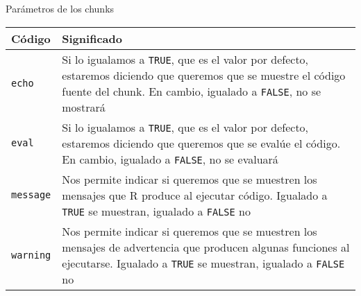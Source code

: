 \documentclass[ignorenonframetext,]{beamer}
\begin{document}
\begin{frame}[fragile]{Parámetros de los chunks}
\protect\hypertarget{parametros-de-los-chunks-1}{}

\begin{longtable}[]{@{}ll@{}}
\toprule
\begin{minipage}[b]{0.47\columnwidth}\raggedright
Código\strut
\end{minipage} & \begin{minipage}[b]{0.47\columnwidth}\raggedright
Significado\strut
\end{minipage}\tabularnewline
\midrule
\endhead
\begin{minipage}[t]{0.47\columnwidth}\raggedright
\texttt{echo}\strut
\end{minipage} & \begin{minipage}[t]{0.47\columnwidth}\raggedright
Si lo igualamos a \texttt{TRUE}, que es el valor por defecto, estaremos
diciendo que queremos que se muestre el código fuente del chunk. En
cambio, igualado a \texttt{FALSE}, no se mostrará\strut
\end{minipage}\tabularnewline
\begin{minipage}[t]{0.47\columnwidth}\raggedright
\texttt{eval}\strut
\end{minipage} & \begin{minipage}[t]{0.47\columnwidth}\raggedright
Si lo igualamos a \texttt{TRUE}, que es el valor por defecto, estaremos
diciendo que queremos que se evalúe el código. En cambio, igualado a
\texttt{FALSE}, no se evaluará\strut
\end{minipage}\tabularnewline
\begin{minipage}[t]{0.47\columnwidth}\raggedright
\texttt{message}\strut
\end{minipage} & \begin{minipage}[t]{0.47\columnwidth}\raggedright
Nos permite indicar si queremos que se muestren los mensajes que R
produce al ejecutar código. Igualado a \texttt{TRUE} se muestran,
igualado a \texttt{FALSE} no\strut
\end{minipage}\tabularnewline
\begin{minipage}[t]{0.47\columnwidth}\raggedright
\texttt{warning}\strut
\end{minipage} & \begin{minipage}[t]{0.47\columnwidth}\raggedright
Nos permite indicar si queremos que se muestren los mensajes de
advertencia que producen algunas funciones al ejecutarse. Igualado a
\texttt{TRUE} se muestran, igualado a \texttt{FALSE} no\strut
\end{minipage}\tabularnewline
\bottomrule
\end{longtable}

\end{frame}
\end{document}
